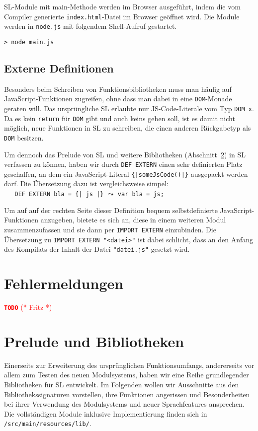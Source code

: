 \documentclass[runningheads]{llncs}
\newcommand{\TODO}[1]{ \textcolor{red}{\textbf{\texttt{\large{TODO}}} (* #1 *)}\par}
\begin{document}
SL-Module mit main-Methode werden im Browser ausgeführt, indem die
vom Compiler generierte \texttt{index.html}-Datei im Browser geöffnet
wird. Die Module werden in \texttt{node.js} mit folgendem Shell-Aufruf
gestartet.

\begin{verbatim}
> node main.js
\end{verbatim}

\subsection{Externe Definitionen}

Besonders beim Schreiben von Funktionsbibliotheken muss man häufig auf
Java\-Script-Funktionen zugreifen, ohne dass man dabei in eine
\verb|DOM|-Monade geraten will. Das ursprüngliche SL erlaubte nur
JS-Code-Literale vom Typ \verb|DOM x|. Da es kein \verb|return| für
\verb|DOM| gibt und auch keins geben soll, ist es damit nicht möglich,
neue Funktionen in SL zu schreiben, die einen anderen Rückgabetyp als
\verb|DOM| besitzen.

Um dennoch das Prelude von SL und weitere Bibliotheken (Abschnitt~\ref{sec:libs})
in SL verfassen zu können, haben wir durch \verb|DEF EXTERN| einen sehr
definierten Platz geschaffen, an dem ein Java\-Script-Literal
\verb.{|someJsCode()|}. ausgepackt werden darf. Die Übersetzung dazu ist
vergleichsweise simpel:\\
\verb.   DEF EXTERN bla = {| js |}.
\quad $\leadsto$ \quad \verb|var bla = js;|

Um auf auf der rechten Seite dieser Definition bequem selbstdefinierte
Java\-Script-Funktionen anzugeben, bietete es sich an, diese in einem
weiteren Modul zusammenzufassen und sie dann per \verb|IMPORT EXTERN|
einzubinden. Die Übersetzung zu \verb|IMPORT EXTERN "<datei>"| ist dabei
schlicht, dass an den Anfang des Kompilats der Inhalt der Datei
\verb|"datei.js"| gesetzt wird.

\section{Fehlermeldungen}
\label{sec:errors}
\TODO{Fritz}

\section{Prelude und Bibliotheken}
\label{sec:libs}

Einerseits zur Erweiterung des ursprünglichen Funktionsumfangs, andererseits
vor allem zum Testen des neuen Modulsystems, haben wir eine Reihe grundlegender
Bibliotheken für SL entwickelt. Im Folgenden wollen wir Ausschnitte aus den
Bibliothekssignaturen vorstellen, ihre Funktionen angerissen und
Besonderheiten bei ihrer Verwendung des Modulsystems und neuer Sprachfeatures
ansprechen. Die vollständigen Module inklusive Implementierung finden sich
in \verb|/src/main/resources/lib/|.
\end{document}
